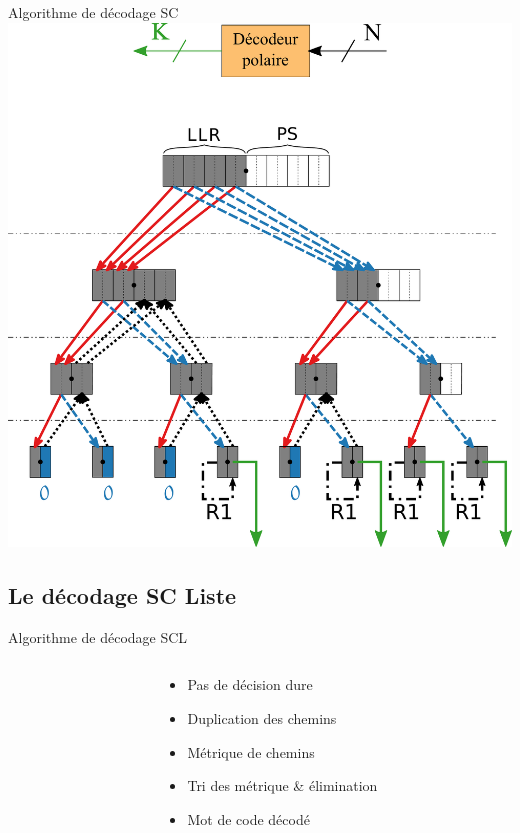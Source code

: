 \documentclass[t,compress,mathserif,12pt,xcolor=dvipsnames]{beamer}
\begin{document}
\begin{frame}[c]{Algorithme de décodage SC}
	\includegraphics[width=.5\textwidth]{fig/sc_tree_output.pdf}
\end{frame}

\subsection{Le décodage SC Liste}

\begin{frame}[c]{Algorithme de décodage SCL}
	\begin{columns}[T] %

		\begin{column}{.7\textwidth}


		\end{column}

		\begin{column}{.3\textwidth}
			\begin{itemize}
				\item<3-> Pas de décision dure
				\item<4-> Duplication des chemins
				\item<5-> Métrique de chemins
				\item<6-> Tri des métrique \& élimination
				\item<7-> Mot de code décodé
			\end{itemize}
		\end{column}

	\end{columns}
\end{frame}
\end{document}
